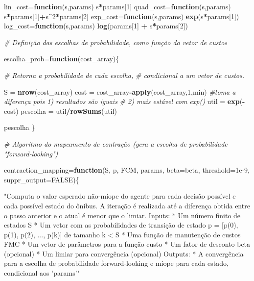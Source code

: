 \documentclass[12pt,a4paper]{article}
\newenvironment{Shaded}{\begin{snugshade}}{\end{snugshade}}
\newcommand{\CommentTok}[1]{\textcolor[rgb]{0.56,0.35,0.01}{\textit{#1}}}
\newcommand{\ControlFlowTok}[1]{\textcolor[rgb]{0.13,0.29,0.53}{\textbf{#1}}}
\newcommand{\DataTypeTok}[1]{\textcolor[rgb]{0.13,0.29,0.53}{#1}}
\newcommand{\DecValTok}[1]{\textcolor[rgb]{0.00,0.00,0.81}{#1}}
\newcommand{\FloatTok}[1]{\textcolor[rgb]{0.00,0.00,0.81}{#1}}
\newcommand{\KeywordTok}[1]{\textcolor[rgb]{0.13,0.29,0.53}{\textbf{#1}}}
\newcommand{\NormalTok}[1]{#1}
\newcommand{\OperatorTok}[1]{\textcolor[rgb]{0.81,0.36,0.00}{\textbf{#1}}}
\newcommand{\OtherTok}[1]{\textcolor[rgb]{0.56,0.35,0.01}{#1}}
\newcommand{\StringTok}[1]{\textcolor[rgb]{0.31,0.60,0.02}{#1}}
\begin{document}
\begin{Shaded}
\begin{Highlighting}[]
\NormalTok{lin_cost=}\ControlFlowTok{function}\NormalTok{(s,params) s}\OperatorTok{*}\NormalTok{params[}\DecValTok{1}\NormalTok{]}
\NormalTok{quad_cost=}\ControlFlowTok{function}\NormalTok{(s,params) s}\OperatorTok{*}\NormalTok{params[}\DecValTok{1}\NormalTok{]}\OperatorTok{+}\NormalTok{s}\OperatorTok{^}\DecValTok{2}\OperatorTok{*}\NormalTok{params[}\DecValTok{2}\NormalTok{]}
\NormalTok{exp_cost=}\ControlFlowTok{function}\NormalTok{(s,params) }\KeywordTok{exp}\NormalTok{(s}\OperatorTok{*}\NormalTok{params[}\DecValTok{1}\NormalTok{])}
\NormalTok{log_cost=}\ControlFlowTok{function}\NormalTok{(s,params) }\KeywordTok{log}\NormalTok{(params[}\DecValTok{1}\NormalTok{] }\OperatorTok{+}\StringTok{ }\NormalTok{s}\OperatorTok{*}\NormalTok{params[}\DecValTok{2}\NormalTok{])}

\CommentTok{# Definição das escolhas de probabilidade, como função do vetor de custos}

\NormalTok{escolha_prob=}\ControlFlowTok{function}\NormalTok{(cost_array)\{}
  
  \CommentTok{# Retorna a probabilidade de cada escolha, }
  \CommentTok{# condicional a um vetor de custos.}
  
\NormalTok{  S =}\StringTok{ }\KeywordTok{nrow}\NormalTok{(cost_array)}
\NormalTok{  cost =}\StringTok{ }\NormalTok{cost_array}\OperatorTok{-}\KeywordTok{apply}\NormalTok{(cost_array,}\DecValTok{1}\NormalTok{,min) }\CommentTok{#toma a diferença pois 1) resultados são iguais}
                                            \CommentTok{# 2) mais estável com exp()}
\NormalTok{  util =}\StringTok{ }\KeywordTok{exp}\NormalTok{(}\OperatorTok{-}\NormalTok{cost)}
\NormalTok{  pescolha =}\StringTok{ }\NormalTok{util}\OperatorTok{/}\KeywordTok{rowSums}\NormalTok{(util)}
  
\NormalTok{  pescolha}
\NormalTok{\}}

\CommentTok{# Algoritmo do mapeamento de contração (gera a escolha de probabilidade "forward-looking")}

\NormalTok{contraction_mapping=}\ControlFlowTok{function}\NormalTok{(S, p, FCM, params, }\DataTypeTok{beta=}\NormalTok{beta, }\DataTypeTok{threshold=}\FloatTok{1e-9}\NormalTok{, }\DataTypeTok{suppr_output=}\OtherTok{FALSE}\NormalTok{)\{}
  
  \StringTok{"Computa o valor esperado não-míope do agente para cada decisão possível }
\StringTok{  e cada possível estado do ônibus.}
\StringTok{  A iteração é realizada até a diferença obtida entre o passo anterior e o atual}
\StringTok{  é menor que o limiar.}
\StringTok{  Inputs:}
\StringTok{  * Um número finito de estados S}
\StringTok{  * Um vetor com as probabilidades de transição de estado p = [p(0), p(1), p(2), ..., p(k)] de tamanho k < S}
\StringTok{  * Uma função de manutenção de custos FMC}
\StringTok{  * Um vetor de parâmetros para a função custo}
\StringTok{  * Um fator de desconto beta (opcional)}
\StringTok{  * Um limiar para convergência (opcional)}
\StringTok{  Outputs:}
\StringTok{  * A convergência para a escolha de probabilidade forward-looking e }
\StringTok{  míope para cada estado, condicional aos 'params'"}
  

\end{Highlighting}
\end{Shaded}
\end{document}
